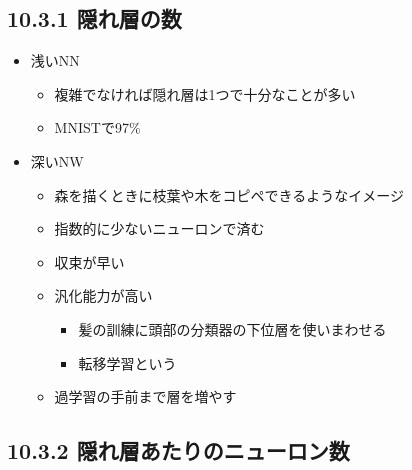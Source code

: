 \hypertarget{ux96a0ux308cux5c64ux306eux6570}{%
\subsection{10.3.1 隠れ層の数}\label{ux96a0ux308cux5c64ux306eux6570}}

\begin{itemize}
\tightlist
\item
  浅いNN

  \begin{itemize}
  \tightlist
  \item
    複雑でなければ隠れ層は1つで十分なことが多い
  \item
    MNISTで97\%
  \end{itemize}
\item
  深いNW

  \begin{itemize}
  \tightlist
  \item
    森を描くときに枝葉や木をコピペできるようなイメージ
  \item
    指数的に少ないニューロンで済む
  \item
    収束が早い
  \item
    汎化能力が高い

    \begin{itemize}
    \tightlist
    \item
      髪の訓練に頭部の分類器の下位層を使いまわせる
    \item
      転移学習という
    \end{itemize}
  \item
    過学習の手前まで層を増やす
  \end{itemize}
\end{itemize}

\hypertarget{ux96a0ux308cux5c64ux3042ux305fux308aux306eux30cbux30e5ux30fcux30edux30f3ux6570}{%
\subsection{10.3.2
隠れ層あたりのニューロン数}\label{ux96a0ux308cux5c64ux3042ux305fux308aux306eux30cbux30e5ux30fcux30edux30f3ux6570}}

